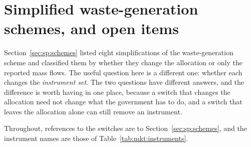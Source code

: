 ﻿\section{Simplified waste-generation schemes, and open items}\label{sec:mkt:schemes}

Section~\ref{sec:sp:schemes} listed eight simplifications of the waste-generation scheme and classified
them by whether they change the allocation or only the reported mass flows. The useful question here is
a different one: whether each changes the \emph{instrument set}. The two questions have different
answers, and the difference is worth having in one place, because a switch that changes the allocation
need not change what the government has to do, and a switch that leaves the allocation alone can still
remove an instrument.

Throughout, references to the switches are to Section~\ref{sec:sp:schemes}, and the instrument names
are those of Table~\ref{tab:mkt:instruments}.

